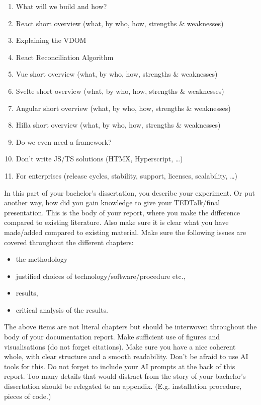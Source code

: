 \begin{enumerate}
    \item What will we build and how?
    \item React short overview (what, by who, how, strengths \& weaknesses)
    \item Explaining the VDOM
    \item React Reconciliation Algorithm
    \item Vue short overview (what, by who, how, strengths \& weaknesses)
    \item Svelte short overview (what, by who, how, strengths \& weaknesses)
    \item Angular short overview (what, by who, how, strengths \& weaknesses)
    \item Hilla short overview (what, by who, how, strengths \& weaknesses)
    \item Do we even need a framework?
    \item Don’t write JS/TS solutions (HTMX, Hyperscript, …) 
    \item For enterprises (release cycles, stability, support, licenses, scalability, …) 
\end{enumerate}

In this part of your bachelor's dissertation, you describe your experiment. Or put another way, how did you gain knowledge to give your TEDTalk/final presentation. 
This is the body of your report, where you make the difference compared to existing literature. Also make sure it is clear what you have made/added compared to existing material.
Make sure the following issues are covered throughout the different chapters:
\begin{itemize}
    \item the methodology
    \item justified choices of technology/software/procedure etc., 
    \item results, 
    \item critical analysis of the results. 
\end{itemize}
The above items are not literal chapters but should be interwoven throughout the body of your documentation report.
Make sufficient use of figures and visualisations (do not forget citations). Make sure you have a nice coherent whole, with clear structure and a smooth readability. Don't be afraid to use AI tools for this. Do not forget to include your AI prompts at the back of this report.
Too many details that would distract from the story of your bachelor's dissertation should be relegated to an appendix. (E.g. installation procedure, pieces of code.) 

